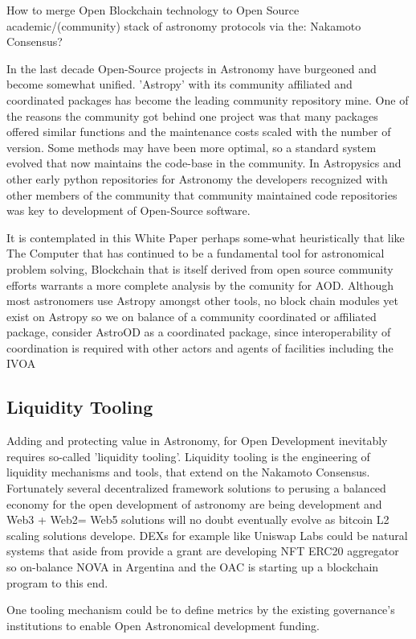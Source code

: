 \documentclass[final,5p,times,twocolumn,authoryear]{elsarticle}
\begin{document}
How to merge Open Blockchain technology to Open Source academic/(community) stack of astronomy protocols via the: Nakamoto Consensus?

In the last decade Open-Source projects in Astronomy have burgeoned and become somewhat unified. 'Astropy' with its community affiliated and coordinated packages has become the leading community repository mine.  One of the reasons the community got behind one project was that many packages offered similar functions and the maintenance costs scaled with the number of version. Some methods may have been more optimal, so a standard system evolved that now maintains the code-base in the community. In Astropysics and other early python repositories for Astronomy the developers recognized with other members of the community that community maintained code repositories was key to development of Open-Source software.

It is contemplated in this White Paper perhaps some-what heuristically that like The Computer that has continued to be a fundamental tool for astronomical problem solving, Blockchain that is itself derived from open source community efforts warrants a more complete analysis by the comunity for AOD. Although most astronomers use Astropy amongst other tools, no block chain modules yet exist on Astropy so we on balance of a community coordinated or affiliated package, consider AstroOD as a coordinated package, since interoperability of coordination is required with other actors and agents of facilities including the IVOA 
\subsection{Liquidity Tooling}
\label{btc2:sec:sub:liquidity}
Adding and protecting value in Astronomy, for Open Development inevitably requires so-called 'liquidity tooling'. Liquidity tooling is the engineering of liquidity mechanisms and tools, that extend on the Nakamoto Consensus. Fortunately several decentralized framework solutions to perusing a balanced economy for the open development of astronomy are being development and Web3 + Web2= Web5 solutions will no doubt eventually evolve as bitcoin L2 scaling solutions develope. DEXs for example like Uniswap Labs could be natural systems that aside from provide a grant are developing NFT ERC20 aggregator so on-balance NOVA in Argentina and the OAC is starting up a blockchain program to this end.

One tooling mechanism could be to define metrics by the existing governance's institutions to enable Open Astronomical development funding.
\end{document}
